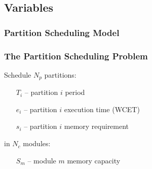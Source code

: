 \documentclass[english, frametitlelogo, mainlogoleft, handout]{beamer}
\begin{document}
\subsection{Variables}

\begin{frame}
    \frametitle{Partition Scheduling Model}
\end{frame}

\begin{frame}
    \frametitle{The Partition Scheduling Problem}

    \begin{minipage}[t]{0.62\linewidth}
    Schedule $N_p$ partitions:

    \begin{itemize}
        \item[$T_i$] -- partition $i$ period
        \item[$e_i$] -- partition $i$ execution time (WCET)
        \item[$s_i$] -- partition $i$ memory requirement
    \end{itemize}

    \vspace{5pt}
    in $N_c$ modules:

    \begin{itemize}
        \item[$S_m$] -- module $m$ memory capacity
    \end{itemize}
    \end{minipage}
    \begin{minipage}[t]{0.37\linewidth}
        \vspace{5pt}
    \end{minipage}

    \vfill
    \centering
    \resizebox{0.9\linewidth}{!}{}
\end{frame}
\end{document}
